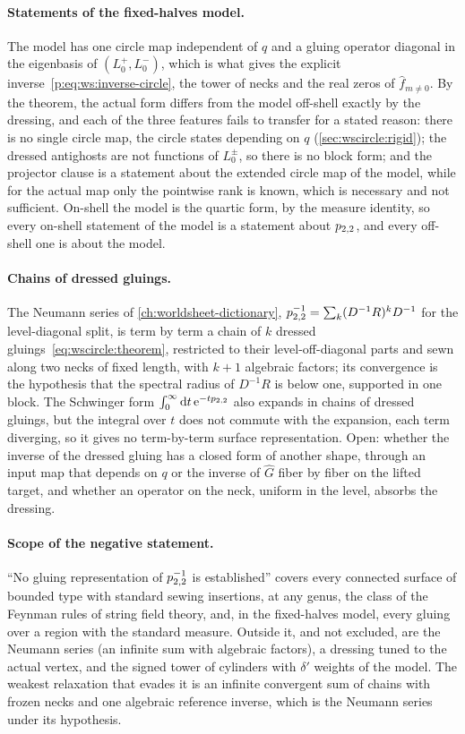 \paragraph{Statements of the fixed-halves model.}
The model has one circle map independent of $q$ and a gluing operator diagonal in the eigenbasis of $(L_0^+, L_0^-)$, which is what gives the explicit inverse~\eqref{p:eq:ws:inverse-circle}, the tower of necks and the real zeros of $\hat f_{m \neq 0}$.
By the theorem, the actual form differs from the model off-shell exactly by the dressing, and each of the three features fails to transfer for a stated reason: there is no single circle map, the circle states depending on $q$ (\cref{sec:wscircle:rigid}); the dressed antighosts are not functions of $L_0^\pm$, so there is no block form; and the projector clause is a statement about the extended circle map of the model, while for the actual map only the pointwise rank is known, which is necessary and not sufficient.
On-shell the model is the quartic form, by the measure identity, so every on-shell statement of the model is a statement about $p_{2,2}$, and every off-shell one is about the model.

\paragraph{Chains of dressed gluings.}
The Neumann series of \cref{ch:worldsheet-dictionary}, $p_{2,2}^{-1} = \sum_k (D^{-1} R)^k D^{-1}$ for the level-diagonal split, is term by term a chain of $k$ dressed gluings~\eqref{eq:wscircle:theorem}, restricted to their level-off-diagonal parts and sewn along two necks of fixed length, with $k + 1$ algebraic factors; its convergence is the hypothesis that the spectral radius of $D^{-1} R$ is below one, supported in one block.
The Schwinger form $\int_0^\infty \mathrm{d} t \, \mathrm{e}^{- t p_{2,2}}$ also expands in chains of dressed gluings, but the integral over $t$ does not commute with the expansion, each term diverging, so it gives no term-by-term surface representation.
Open: whether the inverse of the dressed gluing has a closed form of another shape, through an input map that depends on $q$ or the inverse of $\hat G$ fiber by fiber on the lifted target, and whether an operator on the neck, uniform in the level, absorbs the dressing.

\paragraph{Scope of the negative statement.}
``No gluing representation of $p_{2,2}^{-1}$ is established'' covers every connected surface of bounded type with standard sewing insertions, at any genus, the class of the Feynman rules of string field theory, and, in the fixed-halves model, every gluing over a region with the standard measure.
Outside it, and not excluded, are the Neumann series (an infinite sum with algebraic factors), a dressing tuned to the actual vertex, and the signed tower of cylinders with $\delta'$ weights of the model.
The weakest relaxation that evades it is an infinite convergent sum of chains with frozen necks and one algebraic reference inverse, which is the Neumann series under its hypothesis.

